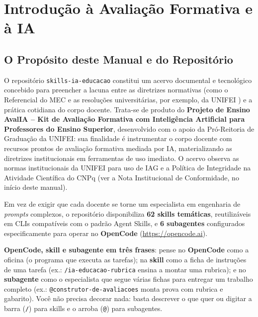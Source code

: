 \chapter{Introdu{\c c}{\~a}o {\`a} Avalia{\c c}{\~a}o Formativa e {\`a} IA}
\label{cap:introducao}

\section{O Prop{\'o}sito deste Manual e do Reposit{\'o}rio}

O reposit{\'o}rio \texttt{skills-ia-educacao} constitui um acervo documental e tecnol{\'o}gico concebido para preencher a lacuna entre as diretrizes normativas (como o Referencial do MEC \cite{brasil2026referencial} e as resolu{\c c}{\~o}es universit{\'a}rias, por exemplo, da UNIFEI \cite{unifei2025graduacao}) e a pr{\'a}tica cotidiana do corpo docente. Trata-se de produto do \textbf{Projeto de Ensino AvalIA -- Kit de Avalia{\c c}{\~a}o Formativa com Intelig{\^e}ncia Artificial para Professores do Ensino Superior}, desenvolvido com o apoio da Pr{\'o}-Reitoria de Gradua{\c c}{\~a}o da UNIFEI: sua finalidade {\'e} instrumentar o corpo docente com recursos prontos de avalia{\c c}{\~a}o formativa mediada por IA, materializando as diretrizes institucionais em ferramentas de uso imediato. O acervo observa as normas institucionais da UNIFEI para uso de IAG \cite{unifei2026guia} e a Pol{\'i}tica de Integridade na Atividade Cient{\'i}fica do CNPq \cite{cnpq2026integridade} (ver a Nota Institucional de Conformidade, no in{\'i}cio deste manual).

Em vez de exigir que cada docente se torne um especialista em engenharia de \emph{prompts} complexos, o reposit{\'o}rio disponibiliza \textbf{62 skills tem{\'a}ticas}, reutiliz{\'a}veis em CLIs compat{\'i}veis com o padr{\~a}o Agent Skills, e \textbf{6 subagentes} configurados especificamente para operar no \textbf{OpenCode} (\url{https://opencode.ai}).

\begin{conceitochave}
\textbf{OpenCode, skill e subagente em tr{\^e}s frases}: pense no \textbf{OpenCode} como a oficina (o programa que executa as tarefas); na \textbf{skill} como a ficha de instru{\c c}{\~o}es de uma tarefa (ex.: \texttt{/ia-educacao-rubrica} ensina a montar uma rubrica); e no \textbf{subagente} como o especialista que segue v{\'a}rias fichas para entregar um trabalho completo (ex.: \texttt{@construtor-de-avaliacoes} monta prova com rubrica e gabarito). Voc{\^e} n{\~a}o precisa decorar nada: basta descrever o que quer ou digitar a barra (\texttt{/}) para skills e o arroba (\texttt{@}) para subagentes.
\end{conceitochave}

